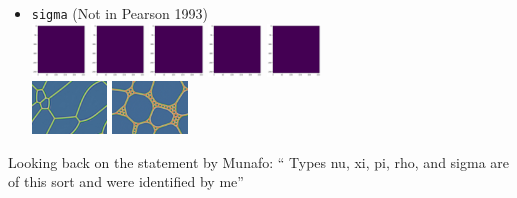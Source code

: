 \begin{itemize}
\item {\tt sigma} (Not in Pearson 1993)\\
\includegraphics[height=1.4cm]{python_codes/fieldstone_171/pearson93_rand/sigma_solution_0001000_u}
\includegraphics[height=1.4cm]{python_codes/fieldstone_171/pearson93_rand/sigma_solution_0010000_u}
\includegraphics[height=1.4cm]{python_codes/fieldstone_171/pearson93_rand/sigma_solution_0030000_u}
\includegraphics[height=1.4cm]{python_codes/fieldstone_171/pearson93_rand/sigma_solution_0050000_u}
\includegraphics[height=1.4cm]{python_codes/fieldstone_171/pearson93_rand/sigma_solution_final_u}\\
\includegraphics[height=1.4cm]{python_codes/fieldstone_171/images/munafo_sigma1}
\includegraphics[height=1.4cm]{python_codes/fieldstone_171/images/munafo_sigma2}

\end{itemize}

Looking back on the statement by Munafo: ``
Types nu, xi, pi, rho, and sigma are of this sort and were identified by me''




